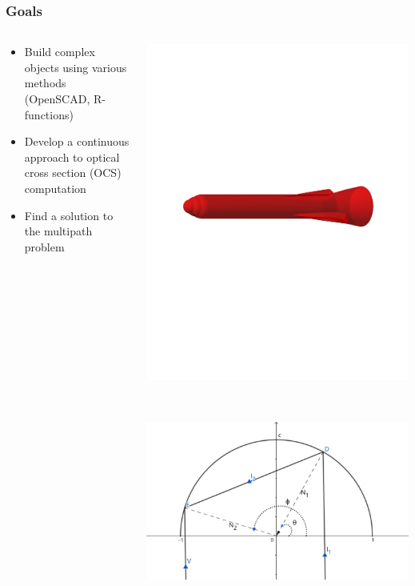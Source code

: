 \documentclass{beamer}
\begin{document}
\begin{frame} 
\frametitle{Goals} 

\begin{columns}
\begin{column}{0.5\textwidth}
\begin{itemize} 
\item Build complex objects using various methods (OpenSCAD, R-functions) 
\item Develop a continuous approach to optical cross section (OCS) computation 
\item Find a solution to the multipath problem 
\end{itemize} 
\end{column}
\begin{column}{0.5\textwidth}
\centerline{\includegraphics[width = 0.6\linewidth]{rocket.pdf}}\\ 
\vspace{5mm}
\centerline{\includegraphics[width = 0.6\linewidth]{./figs/multipath.pdf}}
\end{column}
\end{columns}

\end{frame} 
\end{document}
